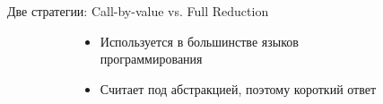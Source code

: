 \begin{frame}{Две стратегии: Call-by-value vs. Full Reduction}
\begin{figure}[ht]
  \begin{subfigure}[t]{.48\textwidth}
  \end{subfigure}
  \begin{subfigure}[t]{.48\textwidth}
   \end{subfigure}
\end{figure}


    \begin{figure}[t]
      \begin{subfigure}[t]{0.45\textwidth}
    \begin{itemize}
    \item[\faGood]    Используется в большинстве языков программирования
    \vspace{4em}
    \end{itemize}
      \end{subfigure}
      \begin{subfigure}[t]{0.45\textwidth}
    \begin{itemize}
      \item[\faGood] Считает под абстракцией, поэтому короткий ответ
    \end{itemize}
      \end{subfigure}
    \end{figure}
\end{frame}

